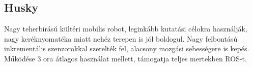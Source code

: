\renewcommand{\xname}{Husky}
\renewcommand{\x}{0.99}
\renewcommand{\y}{0.67}
\renewcommand{\z}{0.39}
\renewcommand{\weight}{50 + 75}
\renewcommand{\img}{MobilisRobotok/clearpathrobotics/husky.jpg}
\renewcommand{\sources}{Forrás: https://robots.ros.org/husky}
\renewcommand{\captionn}{Négykerekű mobilis platform.}
\renewcommand{\watherProf}{Igen}
\renewcommand{\sebesseg}{3.6}
\renewcommand{\AcAndGy}{Igen}
\renewcommand{\GPS}{Igen}

\subsection*{Husky}
Nagy teherbírású kültéri mobilis robot, leginkább kutatási célokra használják, nagy keréknyomatéka miatt nehéz terepen is jól boldogul. Nagy felbontású inkrementális szenzorokkal szerelték fel, alacsony mozgási sebességere is kepés. Működése 3 ora átlagos használat mellett, támogatja teljes mertekben ROS-t.

\renewcommand{\aspectratioPic}{0.6}


